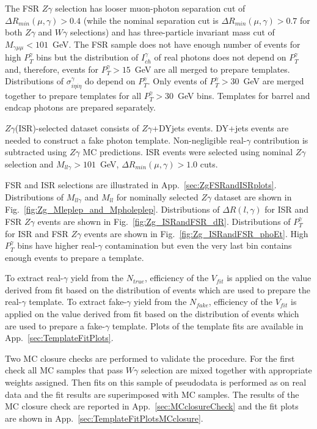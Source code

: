 The FSR $Z\gamma$ selection has looser muon-photon separation cut of $\Delta R_{min}(\mu,\gamma)>0.4$ (while the nominal separation cut is $\Delta R_{min}(\mu,\gamma)>0.7$ for both $Z\gamma$ and $W\gamma$ selections) and has three-particle invariant mass cut of $M_{\gamma\mu\mu}<101$~GeV. The FSR sample does not have enough number of events for high $P_{T}^{\gamma}$ bins but the distribution of $I_{ch}^{\gamma}$ of real photons does not depend on $P_{T}^{\gamma}$ and, therefore, events for $P_{T}^{\gamma}>15$~GeV are all merged to prepare templates. Distributions of $\sigma_{i\eta i\eta}^{\gamma}$ do depend on $P_T^{\gamma}$. Only events of $P_T^{\gamma}>30$~GeV are merged together to prepare templates for all $P_T^{\gamma}>30$~GeV bins. Templates for barrel and endcap photons are prepared separately.

$Z\gamma$(ISR)-selected dataset consists of $Z\gamma$+DYjets events. DY+jets events are needed to construct a fake photon template. Non-negligible real-$\gamma$ contribution is subtracted using $Z\gamma$ MC predictions. ISR events were selected using nominal $Z\gamma$ selection and $M_{ll\gamma}>101$~GeV, $\Delta{R_{min}}(\mu,\gamma)>1.0$ cuts. 

FSR and ISR selections are illustrated in App.~\ref{sec:ZgFSRandISRplots}. Distributions of $M_{ll\gamma}$ and $M_{ll}$ for nominally selected $Z\gamma$ dataset are shown in Fig.~\ref{fig:Zg_Mleplep_and_Mpholeplep}. Distributions of $\Delta{R}(l,\gamma)$ for ISR and FSR $Z\gamma$ events are shown in Fig.~\ref{fig:Zg_ISRandFSR_dR}. Distributions of $P_{T}^{\gamma}$ for ISR and FSR $Z\gamma$ events are shown in Fig.~\ref{fig:Zg_ISRandFSR_phoEt}. High $P_{T}^{\gamma}$ bins have higher real-$\gamma$ contamination but even the very last bin contains enough events to prepare a template. 

To extract real-$\gamma$ yield from the $N_{true}$, efficiency of the $V_{fit}$ is applied on the value derived from fit based on the distribution of events which are used to prepare the real-$\gamma$ template. To extract fake-$\gamma$ yield from the $N_{fake}$, efficiency of the $V_{fit}$ is applied on the value derived from fit based on the distribution of events which are used to prepare a fake-$\gamma$ template. Plots of the template fits are available in App.~\ref{sec:TemplateFitPlots}. 

Two MC closure checks are performed to validate the procedure. For the first check all MC samples that pass $W\gamma$ selection are mixed together with appropriate weights assigned. Then fits on this sample of pseudodata is performed as on real data and the fit results are superimposed with MC samples. The results of the MC closure check are reported in App.~\ref{sec:MCclosureCheck} and the fit plots are shown in App.~\ref{sec:TemplateFitPlotsMCclosure}. 

